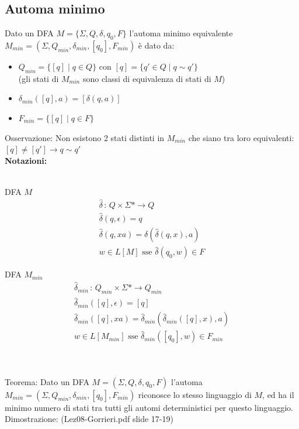 \documentclass[a4paper,12pt]{article}
\begin{document}
{\subsection{Automa minimo}
Dato un DFA $M=\{\Sigma, Q, \delta, q_0, F\}$ l'automa minimo equivalente $M_{min} = (\Sigma, Q_{min}, \delta_{min}, [q_0], F_{min})$ è dato da:
\begin{itemize}
  \item $Q_{min} = \{[q] \mid q \in Q \}$ con $[q] = \{q' \in Q \mid q \sim q' \}$ \\
  (gli stati di $M_{min}$ sono classi di equivalenza di stati di $M$)
  \item $\delta_{min}([q], a) = [\delta(q, a)]$ 
  \item $F_{min} = \{[q] \mid q \in F\}$
\end{itemize}
Osservazione: Non esistono 2 stati distinti in $M_{min}$ che siano tra loro equivalenti: $[q] \neq [q'] \to q \sim q'$
\vspace{10px} \\
\textbf{Notazioni: } \\
\vspace{5px} \\
\begin{minipage}{0.45\textwidth}
    DFA $M$
    \begin{align*}
      \hat{\delta} \, : \, Q \times \Sigma* \to Q \\
      \hat{\delta}(q, \epsilon) = q \\
      \hat{\delta}(q, xa) = \delta(\hat{\delta}(q,x),a)\\
      w \in L[M] \text{ sse } \hat{\delta}(q_0, w) \in F
    \end{align*}
\end{minipage}%
\hfill
\begin{minipage}{0.45\textwidth}
    DFA $M_{min}$
    \begin{align*}
    \hat{\delta}_{min} \, : \, Q_{min} \times \Sigma* \to Q_{min} \\
    \hat{\delta}_{min}([q], \epsilon) = [q] \\
    \hat{\delta}_{min}([q], xa) = \hat{\delta}_{min}(\hat{\delta}_{min}([q], x), a) \\
    w \in L[M_{min}] \text{ sse } \hat{\delta}_{min}([q_0], w) \in F_{min}
     \end{align*}
\end{minipage} \\
\vspace{2em} \\
Teorema: Dato un DFA $M=(\Sigma, Q, \delta, q_0, F)$ l'automa $M_{min} = (\Sigma, Q_{min}, \delta_{min}, [q_0], F_{min})$ riconosce lo stesso linguaggio di $M$, ed ha il minimo numero di stati tra tutti gli automi deterministici per questo linguaggio. \\
Dimostrazione: (Lez08-Gorrieri.pdf slide 17-19) \\
\vspace{2em} \\
}
\end{document}
